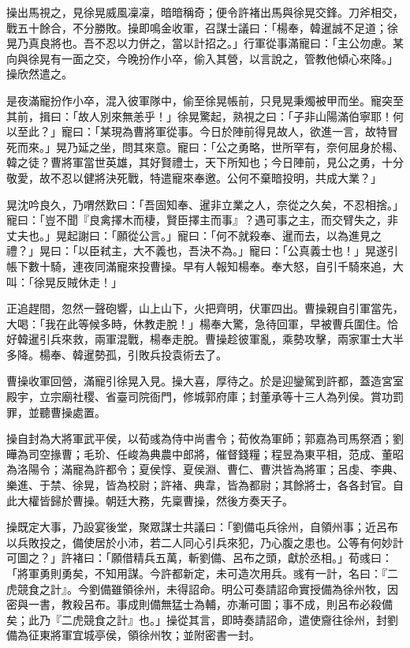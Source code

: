 操出馬視之，見徐晃威風凜凜，暗暗稱奇；便令許褚出馬與徐晃交鋒。刀斧相交，戰五十餘合，不分勝敗。操即鳴金收軍，召謀士議曰：「楊奉，韓暹誠不足道；徐晃乃真良將也。吾不忍以力併之，當以計招之。」行軍從事滿寵曰：「主公勿慮。某向與徐晃有一面之交，今晚扮作小卒，偷入其營，以言說之，管教他傾心來降。」操欣然遣之。

是夜滿寵扮作小卒，混入彼軍隊中，偷至徐晃帳前，只見晃秉燭被甲而坐。寵突至其前，揖曰：「故人別來無恙乎！」徐晃驚起，熟視之曰：「子非山陽滿伯寧耶！何以至此？」寵曰：「某現為曹將軍從事。今日於陣前得見故人，欲進一言，故特冒死而來。」晃乃延之坐，問其來意。寵曰：「公之勇略，世所罕有，奈何屈身於楊、韓之徒？曹將軍當世英雄，其好賢禮士，天下所知也；今日陣前，見公之勇，十分敬愛，故不忍以健將決死戰，特遣寵來奉邀。公何不棄暗投明，共成大業？」

晃沈吟良久，乃喟然歎曰：「吾固知奉、暹非立業之人，奈從之久矣，不忍相捨。」寵曰：「豈不聞『良禽擇木而棲，賢臣擇主而事』？遇可事之主，而交臂失之，非丈夫也。」晃起謝曰：「願從公言。」寵曰：「何不就殺奉、暹而去，以為進見之禮？」晃曰：「以臣弒主，大不義也，吾決不為。」寵曰：「公真義士也！」晃遂引帳下數十騎，連夜同滿寵來投曹操。早有人報知楊奉。奉大怒，自引千騎來追，大叫：「徐晃反賊休走！」

正追趕間，忽然一聲砲響，山上山下，火把齊明，伏軍四出。曹操親自引軍當先，大喝：「我在此等候多時，休教走脫！」楊奉大驚，急待回軍，早被曹兵圍住。恰好韓暹引兵來救，兩軍混戰，楊奉走脫。曹操趁彼軍亂，乘勢攻擊，兩家軍士大半多降。楊奉、韓暹勢孤，引敗兵投袁術去了。

曹操收軍回營，滿寵引徐晃入見。操大喜，厚待之。於是迎鑾駕到許都，蓋造宮室殿宇，立宗廟社稷、省臺司院衙門，修城郭府庫；封董承等十三人為列侯。賞功罰罪，並聽曹操處置。

操自封為大將軍武平侯，以荀彧為侍中尚書令；荀攸為軍師；郭嘉為司馬祭酒；劉曄為司空掾曹；毛玠、任峻為典農中郎將，催督錢糧；程昱為東平相，范成、董昭為洛陽令；滿寵為許都令；夏侯惇、夏侯淵、曹仁、曹洪皆為將軍；呂虔、李典、樂進、于禁、徐晃，皆為校尉；許褚、典韋，皆為都尉；其餘將士，各各封官。自此大權皆歸於曹操。朝廷大務，先稟曹操，然後方奏天子。

操既定大事，乃設宴後堂，聚眾謀士共議曰：「劉備屯兵徐州，自領州事；近呂布以兵敗投之，備使居於小沛，若二人同心引兵來犯，乃心腹之患也。公等有何妙計可圖之？」許褚曰：「願借精兵五萬，斬劉備、呂布之頭，獻於丞相。」荀彧曰：「將軍勇則勇矣，不知用謀。今許都新定，未可造次用兵。彧有一計，名曰：『二虎競食之計』。今劉備雖領徐州，未得詔命。明公可奏請詔命實授備為徐州牧，因密與一書，教殺呂布。事成則備無猛士為輔，亦漸可圖；事不成，則呂布必殺備矣；此乃『二虎競食之計』也。」操從其言，即時奏請詔命，遣使齎往徐州，封劉備為征東將軍宜城亭侯，領徐州牧；並附密書一封。

